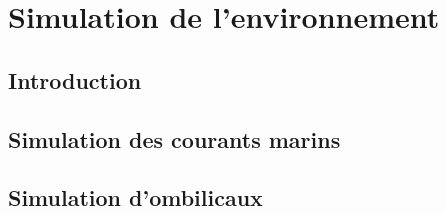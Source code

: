 \chapter{Simulation de l'environnement}

	\section{Introduction}

	\section{Simulation des courants marins}

	\section{Simulation d'ombilicaux}
	